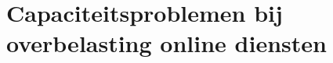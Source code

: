 \documentclass{beamer}
\begin{document}
\section[Capaciteitsproblemen]{Capaciteitsproblemen bij overbelasting online diensten}
% 
% 
% 
% 
% 
\end{document}
